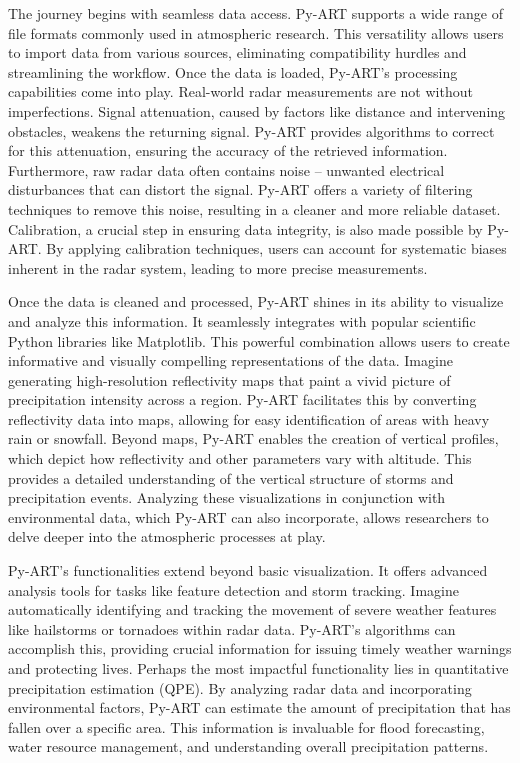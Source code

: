 The journey begins with seamless data access. Py-ART supports a wide range of
file formats commonly used in atmospheric research. This versatility allows
users to import data from various sources, eliminating compatibility hurdles and
streamlining the workflow. Once the data is loaded, Py-ART's processing
capabilities come into play. Real-world radar measurements are not without
imperfections. Signal attenuation, caused by factors like distance and
intervening obstacles, weakens the returning signal. Py-ART provides algorithms
to correct for this attenuation, ensuring the accuracy of the retrieved
information. Furthermore, raw radar data often contains noise – unwanted
electrical disturbances that can distort the signal. Py-ART offers a variety of
filtering techniques to remove this noise, resulting in a cleaner and more
reliable dataset. Calibration, a crucial step in ensuring data integrity, is
also made possible by Py-ART. By applying calibration techniques, users can
account for systematic biases inherent in the radar system, leading to more
precise measurements.

Once the data is cleaned and processed, Py-ART shines in its ability to
visualize and analyze this information. It seamlessly integrates with popular
scientific Python libraries like Matplotlib. This powerful combination allows
users to create informative and visually compelling representations of the data.
Imagine generating high-resolution reflectivity maps that paint a vivid picture
of precipitation intensity across a region. Py-ART facilitates this by
converting reflectivity data into maps, allowing for easy identification of
areas with heavy rain or snowfall.  Beyond maps, Py-ART enables the creation of
vertical profiles, which depict how reflectivity and other parameters vary with
altitude. This provides a detailed understanding of the vertical structure of
storms and precipitation events. Analyzing these visualizations in conjunction
with environmental data, which Py-ART can also incorporate, allows researchers
to delve deeper into the atmospheric processes at play.

Py-ART's functionalities extend beyond basic visualization. It offers advanced
analysis tools for tasks like feature detection and storm tracking. Imagine
automatically identifying and tracking the movement of severe weather features
like hailstorms or tornadoes within radar data. Py-ART's algorithms can
accomplish this, providing crucial information for issuing timely weather
warnings and protecting lives.  Perhaps the most impactful functionality lies in
quantitative precipitation estimation (QPE). By analyzing radar data and
incorporating environmental factors, Py-ART can estimate the amount of
precipitation that has fallen over a specific area. This information is
invaluable for flood forecasting, water resource management, and understanding
overall precipitation patterns.

